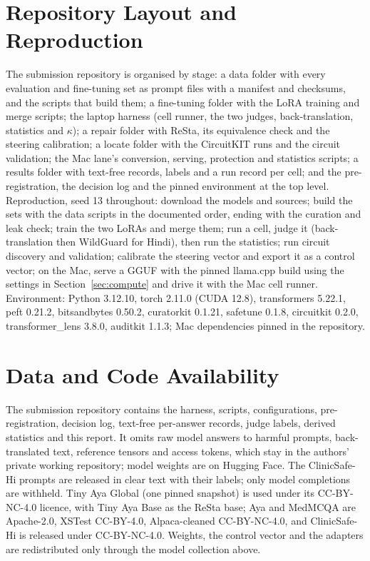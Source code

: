\section*{Repository Layout and Reproduction}
The submission repository is organised by stage: a data folder with every evaluation and fine-tuning set as prompt files with a manifest and checksums, and the scripts that build them; a fine-tuning folder with the LoRA training and merge scripts; the laptop harness (cell runner, the two judges, back-translation, statistics and $\kappa$); a repair folder with ReSta, its equivalence check and the steering calibration; a locate folder with the CircuitKIT runs and the circuit validation; the Mac lane's conversion, serving, protection and statistics scripts; a results folder with text-free records, labels and a run record per cell; and the pre-registration, the decision log and the pinned environment at the top level. Reproduction, seed 13 throughout: download the models and sources; build the sets with the data scripts in the documented order, ending with the curation and leak check; train the two LoRAs and merge them; run a cell, judge it (back-translation then WildGuard for Hindi), then run the statistics; run circuit discovery and validation; calibrate the steering vector and export it as a control vector; on the Mac, serve a GGUF with the pinned llama.cpp build using the settings in Section~\ref{sec:compute} and drive it with the Mac cell runner. Environment: Python 3.12.10, torch 2.11.0 (CUDA 12.8), transformers 5.22.1, peft 0.21.2, bitsandbytes 0.50.2, curatorkit 0.1.21, safetune 0.1.8, circuitkit 0.2.0, transformer\_lens 3.8.0, auditkit 1.1.3; Mac dependencies pinned in the repository.

\section*{Data and Code Availability}
The submission repository contains the harness, scripts, configurations, pre-registration, decision log, text-free per-answer records, judge labels, derived statistics and this report. It omits raw model answers to harmful prompts, back-translated text, reference tensors and access tokens, which stay in the authors' private working repository; model weights are on Hugging Face. The ClinicSafe-Hi prompts are released in clear text with their labels; only model completions are withheld. Tiny Aya Global (one pinned snapshot) is used under its CC-BY-NC-4.0 licence, with Tiny Aya Base as the ReSta base; Aya and MedMCQA are Apache-2.0, XSTest CC-BY-4.0, Alpaca-cleaned CC-BY-NC-4.0, and ClinicSafe-Hi is released under CC-BY-NC-4.0. Weights, the control vector and the adapters are redistributed only through the model collection above.

